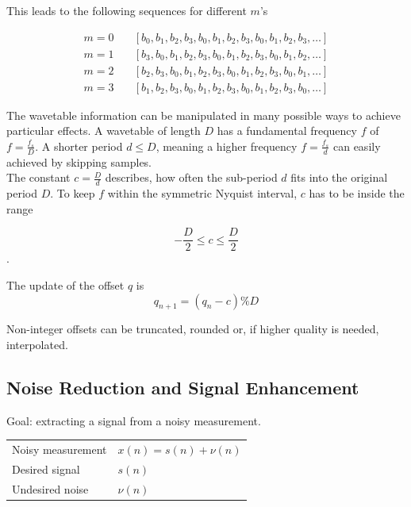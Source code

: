 This leads to the following sequences for different $m$'s

\begin{align*}
	m=0 \quad &[b_0,b_1,b_2,b_3,b_0,b_1,b_2,b_3,b_0,b_1,b_2,b_3,\ldots] \\
	m=1 \quad &[b_3,b_0,b_1,b_2,b_3,b_0,b_1,b_2,b_3,b_0,b_1,b_2,\ldots] \\
	m=2 \quad &[b_2,b_3,b_0,b_1,b_2,b_3,b_0,b_1,b_2,b_3,b_0,b_1,\ldots] \\
	m=3 \quad &[b_1,b_2,b_3,b_0,b_1,b_2,b_3,b_0,b_1,b_2,b_3,b_0,\ldots]
\end{align*}

The wavetable information can be manipulated in many possible ways to achieve
particular effects. A wavetable of length $D$ has a fundamental frequency $f$ 
of $f = \frac{f_s}{D}$. A shorter period $d \leq D$, meaning a higher frequency 
$f = \frac{f_s}{d}$ can easily achieved by skipping samples. \\

The constant $c = \frac{D}{d}$ describes, how often the sub-period $d$ fits into the original period $D$. To keep $f$ within the symmetric Nyquist interval, $c$ has to be inside the range
 
\begin{equation*}
	-\frac{D}{2} \leq c \leq \frac{D}{2}
\end{equation*}.

The update of the offset $q$ is
\begin{equation*}
	q_{n+1} = \left( q_n - c \right) \% D
\end{equation*}

Non-integer offsets can be truncated, rounded or, if higher quality is needed, interpolated. 


\subsection{Noise Reduction and Signal Enhancement}
Goal: extracting a signal from a noisy measurement. \\

\begin{tabularx}{\linewidth}{lX}
	Noisy measurement & $x(n) = s(n) + \nu(n)$ \\
	Desired signal & $s(n)$ \\
	Undesired noise & $\nu(n)$ \\
\end{tabularx} \\

